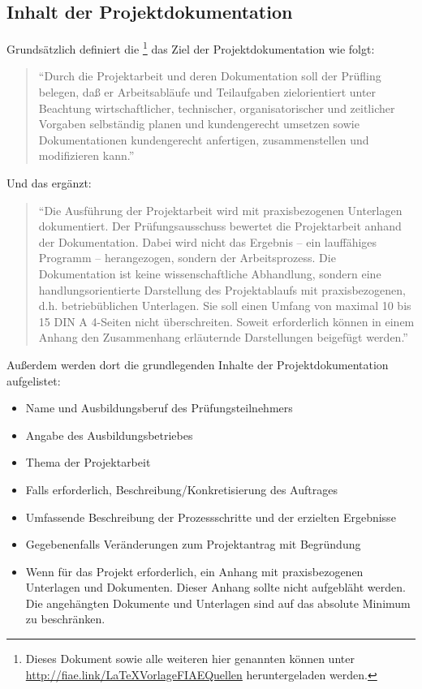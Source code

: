 \subsection*{Inhalt der Projektdokumentation}

Grundsätzlich definiert die \citet[S.~1746]{Bundesgesetzblatt48}\footnote{Dieses
Dokument sowie alle weiteren hier genannten können unter
\url{http://fiae.link/LaTeXVorlageFIAEQuellen} heruntergeladen werden.} das Ziel der Projektdokumentation wie folgt:
\begin{quote}
"`Durch die Projektarbeit und deren Dokumentation soll der Prüfling belegen, daß er Arbeitsabläufe und Teilaufgaben zielorientiert unter
Beachtung wirtschaftlicher, technischer, organisatorischer und zeitlicher Vorgaben selbständig planen und kundengerecht umsetzen sowie
Dokumentationen kundengerecht anfertigen, zusammenstellen und modifizieren kann."'
\end{quote}

Und das \citet[S.~36]{BMBF2000} ergänzt:
\begin{quote}
"`Die Ausführung der Projektarbeit wird mit praxisbezogenen Unterlagen dokumentiert.
Der Prüfungsausschuss bewertet die Projektarbeit anhand der Dokumentation. Dabei
wird nicht das Ergebnis -- \zB ein lauffähiges Programm -- herangezogen, sondern
der Arbeitsprozess. Die Dokumentation ist keine wissenschaftliche Abhandlung,
sondern eine handlungsorientierte Darstellung des Projektablaufs mit
praxisbezogenen, d.h. betriebüblichen Unterlagen. Sie soll einen Umfang von
maximal 10 bis 15 DIN A 4-Seiten nicht überschreiten. Soweit erforderlich können in
einem Anhang \zB den Zusammenhang erläuternde Darstellungen beigefügt werden."'
\end{quote}

Außerdem werden dort die grundlegenden Inhalte der Projektdokumentation aufgelistet:
\begin{itemize}
	\item Name und Ausbildungsberuf des Prüfungsteilnehmers
	\item Angabe des Ausbildungsbetriebes
	\item Thema der Projektarbeit
	\item Falls erforderlich, Beschreibung/Konkretisierung des Auftrages
	\item Umfassende Beschreibung der Prozessschritte und der erzielten Ergebnisse
	\item Gegebenenfalls Veränderungen zum Projektantrag mit Begründung
	\item Wenn für das Projekt erforderlich, ein Anhang mit praxisbezogenen Unterlagen und Dokumenten. Dieser Anhang sollte nicht
	aufgebläht werden. Die angehängten Dokumente und Unterlagen sind auf das absolute Minimum zu beschränken.
\end{itemize}

